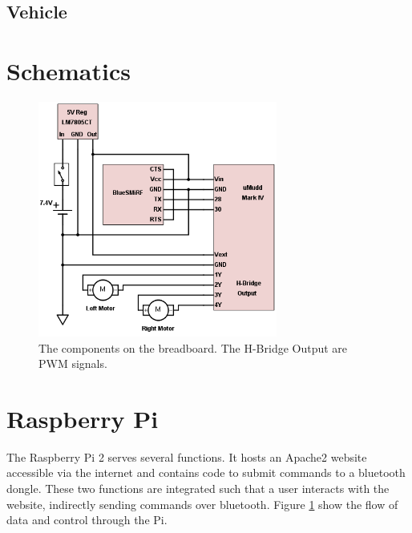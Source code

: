 \documentclass[12pt]{article}
\begin{document}
\subsection{Vehicle}
\section{Schematics}

\begin{figure}
\begin{center}
\includegraphics[width=0.7\textwidth]{breadboard}
\end{center}
\caption{The components on the breadboard. The H-Bridge Output are PWM signals.}
\label{fig:piroutines}
\end{figure}

\section{Raspberry Pi}

The Raspberry Pi 2 serves several functions. It hosts an Apache2 website accessible via the internet and contains code to submit commands to a bluetooth dongle. These two functions are integrated such that a user interacts with the website, indirectly sending commands over bluetooth. Figure \ref{fig:piroutines} show the flow of data and control through the Pi.
\end{document}
